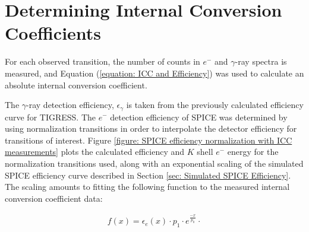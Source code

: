 



\section{Determining Internal Conversion Coefficients}
\label{sec: Determining Internal Conversion Coefficients}

For each observed transition, the number of counts in $e^-$ and $\gamma$-ray spectra is measured, and Equation (\ref{equation: ICC and Efficiency}) was used to calculate an absolute internal conversion coefficient.

The $\gamma$-ray detection efficiency, $\epsilon_\gamma$ is taken from the previously calculated efficiency curve for TIGRESS. The $e^-$ detection efficiency of SPICE was determined by using normalization transitions in order to interpolate the detector efficiency for transitions of interest. Figure \ref{figure: SPICE efficiency normalization with ICC measurements} plots the calculated efficiency and $K$ shell $e^-$ energy for the normalization transitions used, along with an exponential scaling of the simulated SPICE efficiency curve described in Section \ref{sec: Simulated SPICE Efficiency}. The scaling amounts to fitting the following function to the measured internal conversion coefficient data:

\begin{gather}
f(x) =  \epsilon_e(x) \cdot p_1 \cdot e^{\frac{-x}{p_0}} \cdot
\label{equation: exponential scaling}
\end{gather}

